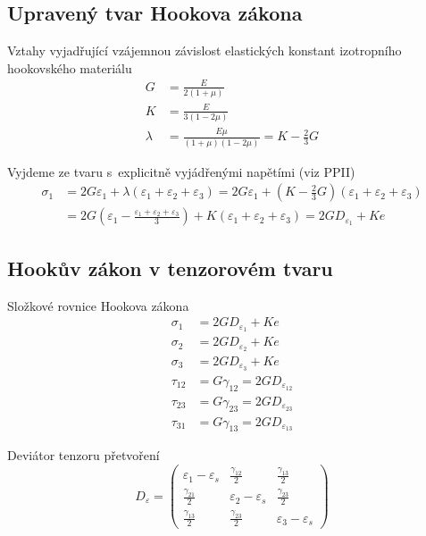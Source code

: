 
\subsection{Upravený tvar Hookova zákona}\label{sec:hookeuv-zakon}
Vztahy vyjadřující vzájemnou závislost elastických konstant izotropního hookovského materiálu
\begin{align}
G &= \frac{E}{2 (1+\mu)}\\
K &= \frac{E}{3 (1 - 2\mu)}\\
\lambda &= \frac{E \mu}{(1 + \mu)(1 - 2\mu)} = K - \frac{2}{3} G
\end{align}

Vyjdeme ze tvaru s~explicitně vyjádřenými napětími (viz PPII)
\begin{equation}\begin{split}
\sigma_1
&= 2 G \varepsilon_1 + \lambda (\varepsilon_1 + \varepsilon_2 + \varepsilon_3) =
2 G \varepsilon_1 + \left(K - \frac{2}{3} G\right)\left(\varepsilon_1 + \varepsilon_2 + \varepsilon_3\right)\\
&= 2 G \left(\varepsilon_1 - \frac{\varepsilon_1 + \varepsilon_2 + \varepsilon_3}{3}\right) + K \left(\varepsilon_1 + \varepsilon_2 + \varepsilon_3\right) =
2 G D_{\varepsilon_1} + K e
\end{split}\end{equation}

\subsection{Hookův zákon v tenzorovém tvaru}
Složkové rovnice Hookova zákona
\begin{align}
\sigma_1 &= 2 G D_{\varepsilon_1} + K e\\
\sigma_2 &= 2 G D_{\varepsilon_2} + K e\\
\sigma_3 &= 2 G D_{\varepsilon_3} + K e\\
\tau_{12} &= G \gamma_{12} = 2 G D_{\varepsilon_{12}}\\
\tau_{23} &= G \gamma_{23} = 2 G D_{\varepsilon_{23}}\\
\tau_{31} &= G \gamma_{13} = 2 G D_{\varepsilon_{13}}
\end{align}%

Deviátor tenzoru přetvoření
\begin{equation}
D_\varepsilon = \left( \begin{matrix}
\varepsilon_1 - \varepsilon_s & \frac{\gamma_{12}}{2} & \frac{\gamma_{13}}{2}\\
\frac{\gamma_{21}}{2} & \varepsilon_2 - \varepsilon_s & \frac{\gamma_{23}}{2}\\
\frac{\gamma_{13}}{2} & \frac{\gamma_{23}}{2} & \varepsilon_3 - \varepsilon_s
\end{matrix} \right)
\end{equation}

